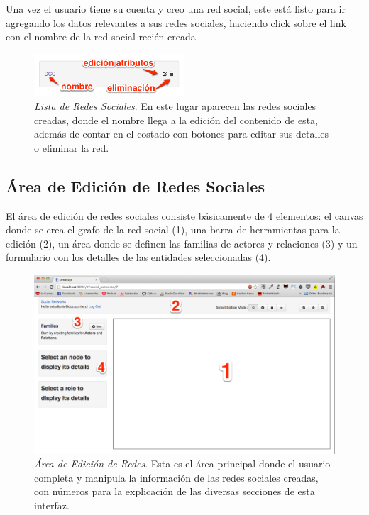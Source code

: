 Una vez el usuario tiene su cuenta y creo una red social, este está listo para ir agregando los datos relevantes a sus redes sociales, haciendo click sobre el link con el nombre de la red social recién creada

\begin{figure}[H]
  \centering
  \includegraphics[width=0.5\textwidth]{images/lista_redes_sociales.png}
  \caption[Lista de Redes Sociales]{\emph{Lista de Redes Sociales}. En este lugar aparecen las redes sociales creadas, donde el nombre llega a la edición del contenido de esta, además de contar en el costado con botones para editar sus detalles o eliminar la red.}
  \label{lista_redes_sociales}
\end{figure}

\subsection{Área de Edición de Redes Sociales} %
\label{sub:area_de_edicion_de_redes_sociales}

El área de edición de redes sociales consiste básicamente de 4 elementos: el canvas donde se crea el grafo de la red social (1), una barra de herramientas para la edición (2), un área donde se definen las familias de actores y relaciones (3) y un formulario con los detalles de las entidades seleccionadas (4).

\begin{figure}[H]
  \includegraphics[width=1.0\textwidth]{images/area_edicion_redes.png}
  \caption[Área de Edición de Redes]{\emph{Área de Edición de Redes}. Esta es el área principal donde el usuario completa y manipula la información de las redes sociales creadas, con números para la explicación de las diversas secciones de esta interfaz.}
  \label{area_edicion_redes}
\end{figure}

